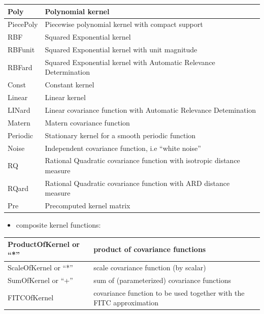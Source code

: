 \documentclass[letterpaper,10pt,english]{sphinxmanual}
\begin{document}
\begin{tabulary}{\linewidth}{|L|L|}
\hline

Poly
 & 
Polynomial kernel
\\\hline

PiecePoly
 & 
Piecewise polynomial kernel with compact support
\\\hline

RBF
 & 
Squared Exponential kernel
\\\hline

RBFunit
 & 
Squared Exponential kernel with unit magnitude
\\\hline

RBFard
 & 
Squared Exponential kernel with Automatic Relevance Determination
\\\hline

Const
 & 
Constant kernel
\\\hline

Linear
 & 
Linear kernel
\\\hline

LINard
 & 
Linear covariance function with Automatic Relevance Detemination
\\\hline

Matern
 & 
Matern covariance function
\\\hline

Periodic
 & 
Stationary kernel for a smooth periodic function
\\\hline

Noise
 & 
Independent covariance function, i.e ``white noise''
\\\hline

RQ
 & 
Rational Quadratic covariance function with isotropic distance measure
\\\hline

RQard
 & 
Rational Quadratic covariance function with ARD distance measure
\\\hline

Pre
 & 
Precomputed kernel matrix
\\\hline
\end{tabulary}

\begin{itemize}
\item {} 
composite kernel functions:

\end{itemize}

\begin{tabulary}{\linewidth}{|L|L|}
\hline

ProductOfKernel or ``*''
 & 
product of covariance functions
\\\hline

ScaleOfKernel or ``*''
 & 
scale covariance function (by scalar)
\\\hline

SumOfKernel or ``+''
 & 
sum of (parameterized) covariance functions
\\\hline

FITCOfKernel
 & 
covariance function to be used together with the FITC approximation
\\\hline
\end{tabulary}
\end{document}
